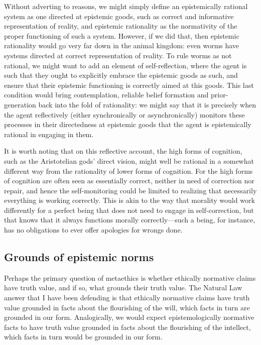 Without adverting to reasons, we might simply define an epistemically rational system as one directed at 
epistemic goods, such as correct and informative representation of reality, and epistemic rationality as 
the normativity of the proper functioning of such a system. However, if we did that, then epistemic rationality
would go very far down in the animal kingdom: even worms have systems directed at correct representation of 
reality. To rule worms as not rational, we might want to add an element of self-reflection, where the agent 
is such that they ought to explicitly embrace the epistemic goods as such, and ensure that their epistemic 
functioning is correctly aimed at this goods. This last condition would bring contemplation, reliable
belief formation and prior-generation back into the fold of rationality: we might say that it is precisely 
when the agent reflectively (either synchronically or asynchronically) monitors these processes in their 
directedness at epistemic goods that the agent is epistemically rational in engaging in them. 

It is worth noting that on this reflective account, the high forms of cognition, such as the 
Aristotelian gods' direct vision, might well be rational in a somewhat different way from the rationality 
of lower forms of cognition. For the high forms of cognition 
are often seen as essentially correct, neither in need of correction nor repair, and hence the 
self-monitoring could be limited to realizing that necessarily everything is working correctly. 
This is akin to the way that morality would work differently for a perfect being that does not need 
to engage in self-correction, but that knows that it always functions morally correctly---such a being,
for instance, has no obligations to ever offer apologies for wrongs done. 

\subsection{Grounds of epistemic norms}
Perhaps the primary question of metaethics is whether ethically normative claims have truth value, and if so, what grounds their truth value.
The Natural Law answer that I have been defending is that ethically normative claims have truth value grounded in facts about the 
flourishing of the will, which facts in turn are grounded in our form. Analogically, we would expect epistemologically 
normative facts to have truth value grounded in facts about the flourishing of the intellect, which facts in turn would be grounded
in our form.


